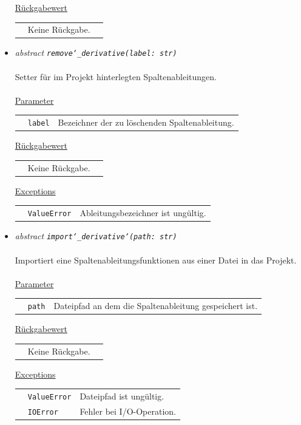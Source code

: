 \documentclass{article}
\begin{document}
\begin{itemize}
\underline{Rückgabewert}\\
\begin{tabular}{lll}
 & Keine Rückgabe.\\
\end{tabular}


\item \textit{\flqq{}abstract\frqq} \texttt{\textit{remove\char`_derivative(label: str)}}\\\\
Setter für im Projekt hinterlegten Spaltenableitungen.
\\\\
\underline{Parameter}\\
\begin{tabular}{lll}
 & \texttt{label} & Bezeichner der zu löschenden Spaltenableitung.\\
\end{tabular}

\underline{Rückgabewert}\\
\begin{tabular}{lll}
 & Keine Rückgabe.\\
\end{tabular}

\underline{Exceptions}\\
\begin{tabular}{lll}
 & \texttt{ValueError} & Ableitungsbezeichner ist ungültig.\\
\end{tabular}


\item \textit{\flqq{}abstract\frqq} \texttt{\textit{import\char`_derivative\char`(path: str)}}\\\\
Importiert eine Spaltenableitungsfunktionen aus einer Datei in das Projekt.
\\\\
\underline{Parameter}\\
\begin{tabular}{lll}
 & \texttt{path} & Dateipfad an dem die Spaltenableitung gespeichert ist.\\
\end{tabular}

\underline{Rückgabewert}\\
\begin{tabular}{lll}
 & Keine Rückgabe.\\
\end{tabular}

\underline{Exceptions}\\
\begin{tabular}{lll}
 & \texttt{ValueError} & Dateipfad ist ungültig.\\
 & \texttt{IOError} & Fehler bei I/O-Operation.\\
\end{tabular}



\end{itemize}
\end{document}
